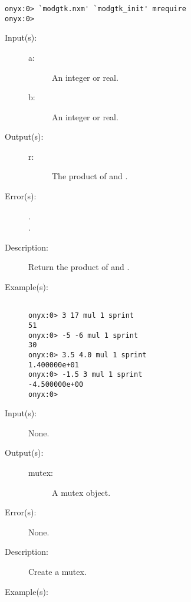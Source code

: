 \begin{description}
\begin{description}
\begin{verbatim}
onyx:0> `modgtk.nxm' `modgtk_init' mrequire
onyx:0>
	\end{verbatim}
	\end{description}
\label{systemdict:mul}
\item[{\onyxop{a b}{mul}{r}}: ]
	\begin{description}\item[]
	\item[Input(s): ]
		\begin{description}\item[]
		\item[a: ]
			An integer or real.
		\item[b: ]
			An integer or real.
		\end{description}
	\item[Output(s): ]
		\begin{description}\item[]
		\item[r: ]
			The product of  and .
		\end{description}
	\item[Error(s): ]
		\begin{description}\item[]
		\item[.]
		\item[.]
		\end{description}
	\item[Description: ]
		Return the product of  and .
	\item[Example(s): ]\begin{verbatim}

onyx:0> 3 17 mul 1 sprint
51
onyx:0> -5 -6 mul 1 sprint
30
onyx:0> 3.5 4.0 mul 1 sprint
1.400000e+01
onyx:0> -1.5 3 mul 1 sprint
-4.500000e+00
onyx:0>
		\end{verbatim}
	\end{description}
\label{systemdict:mutex}
\item[{\onyxop{--}{mutex}{mutex}}: ]
	\begin{description}\item[]
	\item[Input(s): ] None.
	\item[Output(s): ]
		\begin{description}\item[]
		\item[mutex: ]
			A mutex object.
		\end{description}
	\item[Error(s): ] None.
	\item[Description: ]
		Create a mutex.
	\item[Example(s): ]\begin{verbatim}


\end{verbatim}
\end{description}
\end{description}
